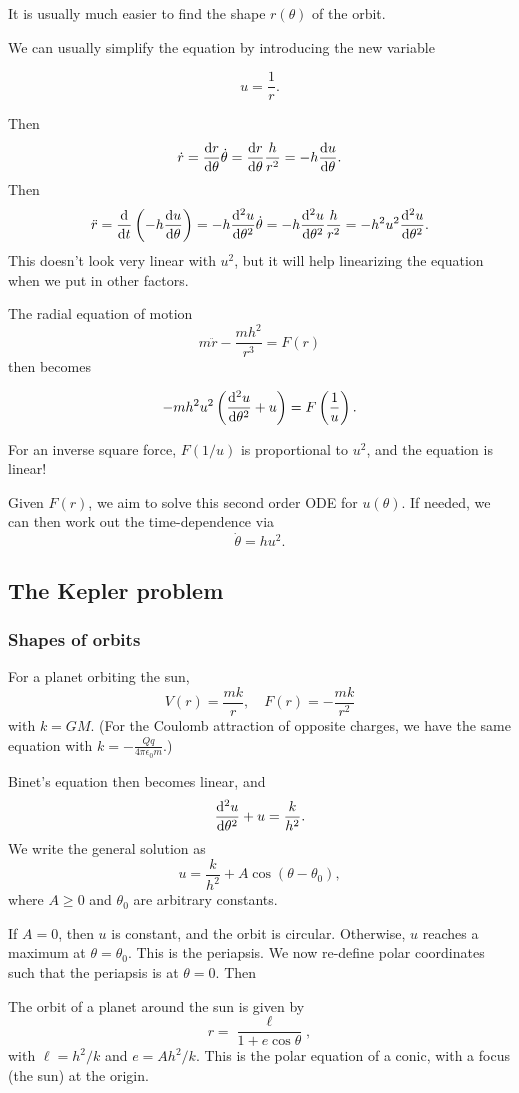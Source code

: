\documentclass[a4paper]{article}
\begin{document}
It is usually much easier to find the shape $r(\theta)$ of the orbit.

We can usually simplify the equation by introducing the new variable
\begin{notation}
  \[
    u = \frac{1}{r}.
  \]
\end{notation}
Then
\[
  \dot{r} = \frac{\mathrm{d} r}{\mathrm{d} \theta}\dot{\theta} = \frac{\mathrm{d} r}{\mathrm{d} \theta}\frac{h}{r^2} = -h\frac{\mathrm{d} u}{\mathrm{d} \theta}.
\]
Then
\[
  \ddot{r} = \frac{\mathrm{d} }{\mathrm{d} t}\left(-h \frac{\mathrm{d} u}{\mathrm{d} \theta}\right) = -h\frac{\mathrm{d} ^2 u}{\mathrm{d} \theta^2}\dot{\theta} = -h\frac{\mathrm{d} ^2u}{\mathrm{d} \theta^2}\frac{h}{r^2} = -h^2u^2\frac{\mathrm{d}^2 u}{\mathrm{d} \theta^2}.
\]
This doesn't look very linear with $u^2$, but it will help linearizing the equation when we put in other factors.

The radial equation of motion 
\[
  m\ddot{r} - \frac{mh^2}{r^3} = F(r)
\]
then becomes
\begin{prop}
  \[
    -mh^2u^2\left(\frac{\mathrm{d}^2u}{\mathrm{d} \theta^2}+ u\right) = F\left(\frac{1}{u}\right).
  \]
\end{prop}
For an inverse square force, $F(1/u)$ is proportional to $u^2$, and the equation is linear!

Given $F(r)$, we aim to solve this second order ODE for $u(\theta)$. If needed, we can then work out the time-dependence via
\[
  \dot{\theta} = hu^2.
\]
\subsection{The Kepler problem}
\subsubsection{Shapes of orbits}
For a planet orbiting the sun,
\[
  V(r) = \frac{mk}{r},\quad F(r) = -\frac{mk}{r^2}
\]
with $k = GM$.
(For the Coulomb attraction of opposite charges, we have the same equation with $\displaystyle k = -\frac{Qq}{4\pi\epsilon_0 m}$.)

Binet's equation then becomes linear, and
\[
  \frac{\mathrm{d}^2 u}{\mathrm{d} \theta^2} + u = \frac{k}{h^2}.
\]
We write the general solution as
\[
  u = \frac{k}{h^2} + A\cos(\theta - \theta_0),
\]
where $A \geq 0$ and $\theta_0$ are arbitrary constants.

If $A = 0$, then $u$ is constant, and the orbit is circular. Otherwise, $u$ reaches a maximum at $\theta = \theta_0$. This is the periapsis. We now re-define polar coordinates such that the periapsis is at $\theta = 0$. Then
\begin{prop}
  The orbit of a planet around the sun is given by
  \[
    r = \frac{\ell}{1 + e\cos \theta},\tag{$*$}
  \]
  with $\ell = h^2/k$ and $e = Ah^2/k$. This is the polar equation of a conic, with a focus (the sun) at the origin.
\end{prop}
\end{document}
